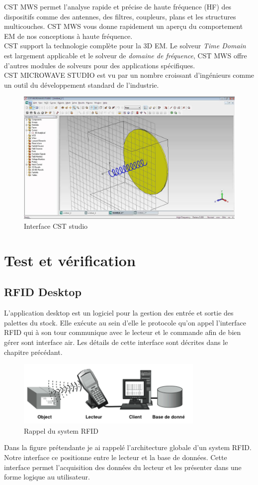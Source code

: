 \documentclass[11pt, a4paper, twoside]{book}
\begin{document}
CST MWS permet l'analyse rapide et précise de haute fréquence (HF) des dispositifs comme des antennes, des filtres, coupleurs, plans et les structures multicouches.  CST MWS vous donne rapidement un aperçu du comportement EM de nos conceptions à haute fréquence.\\

CST support la technologie complète pour la 3D EM. Le solveur \emph{Time Domain} est largement applicable et le solveur de \emph{domaine de fréquence}, CST MWS offre d'autres modules de solveurs pour des applications spécifiques. \\

CST MICROWAVE STUDIO est vu par un nombre croissant d'ingénieurs comme un outil du développement standard de l'industrie.
\begin{figure}[H]
\centering
\includegraphics[width=\textwidth]{cst}
\caption{Interface CST studio}
\end{figure}
\section{Test	 et vérification	}
\subsection{RFID Desktop}
L'application desktop  est un logiciel pour la gestion des entrée et sortie des palettes du stock. Elle exécute au sein d'elle le protocole qu'on appel l'interface RFID qui à son tour communique avec le lecteur et le commande afin de bien gérer sont interface air. Les détails de cette interface sont décrites dans le chapitre précédant. 
\begin{figure}[H]
\centering
\includegraphics[width=9cm]{systemx}
\caption{Rappel du system RFID}
\end{figure}
Dans la figure prétendante je ai rappelé l'architecture globale d'un system RFID. Notre interface ce positionne entre le lecteur et la base de données. Cette interface permet l'acquisition des données du lecteur et les présenter dans une forme logique au utilisateur.
\end{document}
